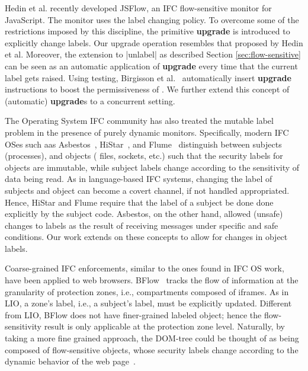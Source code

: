 Hedin et al. \citep{Hedin13} recently developed JSFlow, an IFC flow-sensitive
monitor for JavaScript. The monitor uses the {\nsu} label changing
policy. To overcome some of the restrictions imposed by this discipline, the
primitive \textbf{upgrade} is introduced to explicitly change labels. Our
upgrade operation resembles that proposed by Hedin et al. Moreover, the
extension to |unlabel| as described Section \ref{sec:flow-sensitive} can be seen as an
automatic application of \textbf{upgrade} every time that the current label gets
raised. Using testing, Birgisson et al.~\citep{Arnar2012} automatically insert
\textbf{upgrade} instructions to boost the permissiveness of {\nsu}.
We further extend this concept of (automatic) \textbf{upgrade}s to a concurrent setting.


The Operating System IFC community has also treated the mutable label
problem in the presence of purely dynamic monitors.
%
Specifically, modern IFC OSes such aas
Asbestos~\cite{Efstathopoulos:2005}, HiStar~\cite{zeldovich:histar},
and Flume~\cite{krohn:flume} distinguish between subjects
(processes), and objects ( files, sockets, etc.) such that the
security labels for objects are immutable, while subject labels change
according to the sensitivity of data being read.
%
As in language-based IFC systems, changing the label of subjects and
object can become a covert channel, if not handled appropriated.
%
Hence, HiStar and Flume require that the label of a subject be done
done explicitly by the subject code.
%
Asbestos, on the other hand, allowed (unsafe) changes to labels as the result
of receiving messages under specific and safe conditions.
%
Our work extends on these concepts to allow for changes in object
labels.

Coarse-grained IFC enforcements, similar to the ones found in IFC OS
work, have been applied to web browsers. BFlow~\citep{Yip:2009} tracks
the flow of information at the granularity of protection zones, i.e.,
compartments composed of iframes. As in LIO, a zone's label, i.e., a
subject's label, must be explicitly updated. Different from LIO, BFlow
does not have finer-grained labeled object; hence the flow-sensitivity
result is only applicable at the protection zone level.  Naturally, by
taking a more fine grained approach, the DOM-tree could be thought of
as being composed of flow-sensitive objects, whose security
labels change according to the dynamic behavior of the web
page~\citep{Russo:2009}.

